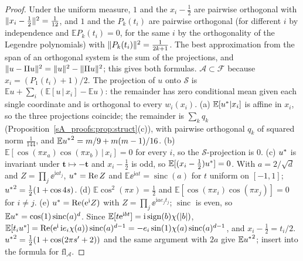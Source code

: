 \begin{proof}
Under the uniform measure, $1$ and the $x_i-\frac12$ are pairwise orthogonal with
$\lVert x_i-\frac12\rVert^2=\frac1{12}$, and $1$ and the $P_k(t_i)$ are pairwise orthogonal (for different
$i$ by independence and $\mathbb EP_k(t_i)=0$, for the same $i$ by the orthogonality of the Legendre
polynomials) with $\lVert P_k(t_i)\rVert^2=\frac1{2k+1}$. The best approximation from the span of an
orthogonal system is the sum of the projections, and $\lVert u-\Pi u\rVert^2=\lVert u\rVert^2-\lVert \Pi u\rVert^2$; this
gives both formulas. $\mathcal A\subset\mathcal F$ because $x_i=(P_1(t_i)+1)/2$. The projection of
$u$ onto $\mathcal S$ is $\mathbb Eu+\sum_i(\mathbb E[u\,|\,x_i]-\mathbb Eu)$: the remainder has zero
conditional mean given each single coordinate and is orthogonal to every $w_i(x_i)$.
(a) $\mathbb E[u^{*}|x_i]$ is affine in $x_i$, so the three projections coincide; the remainder is
$\sum_kq_k$ (Proposition~\ref{sA_proofs:prop:struct}(c)), with pairwise orthogonal $q_k$ of squared
norm $\frac1{144}$, and $\mathbb E{u^{*}}^2=m/9+m(m-1)/16$.
(b) $\mathbb E[\cos(\pi x_a)\cos(\pi x_b)\,|\,x_i]=0$ for every $i$, so the $\mathcal S$-projection is $0$.
(c) $u^{*}$ is invariant under $\boldsymbol t\mapsto-\boldsymbol t$ and $x_i-\frac12$ is odd, so
$\mathbb E[(x_i-\frac12)u^{*}]=0$. With $a=2/\sqrt d$ and $Z=\prod_j\ee^{\mathrm iat_j}$,
$u^{*}=\operatorname{Re}Z$ and $\mathbb E\ee^{\mathrm iat}=\operatorname{sinc}(a)$ for $t$ uniform on $[-1,1]$;
${u^{*}}^2=\frac12(1+\cos4s)$.
(d) $\mathbb E\cos^2(\pi x)=\frac12$ and $\mathbb E[\cos(\pi x_i)\cos(\pi x_j)]=0$ for $i\ne j$.
(e) $u^{*}=\operatorname{Re}(\mathrm{e}^{\mathrm i}Z)$ with $Z=\prod_j\ee^{\mathrm iae_jt_j}$; $\operatorname{sinc}$ is even, so
$\mathbb Eu^{*}=\cos(1)\operatorname{sinc}(a)^d$. Since $\mathbb E[t\mathrm{e}^{\mathrm ibt}]=\mathrm i\,\mathrm{sign}(b)\chi(\lvert b\rvert)$,
$\mathbb E[t_iu^{*}]=\operatorname{Re}(\mathrm{e}^{\mathrm i}\,\mathrm ie_i\chi(a))\operatorname{sinc}(a)^{d-1}=-e_i\sin(1)\chi(a)\operatorname{sinc}(a)^{d-1}$,
and $x_i-\frac12=t_i/2$. ${u^{*}}^2=\frac12(1+\cos(2\pi s'+2))$ and the same argument with $2a$ give
$\mathbb E{u^{*}}^2$; insert into the formula for $\mathrm{fl}_{\mathcal A}$.
\end{proof}

